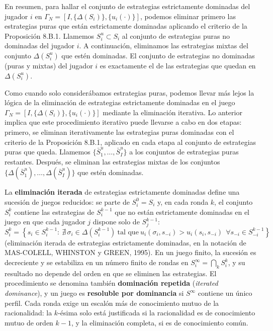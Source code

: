 \documentclass[10pt,a4paper]{article}
\begin{document}
\begin{cita}
En resumen, para hallar el conjunto de estrategias estrictamente dominadas del jugador $i$ en $\Gamma_N=[I,\{\Delta(S_i)\},\{u_i(\cdot)\}]$, podemos eliminar primero las estrategias puras que están estrictamente dominadas aplicando el criterio de la Proposición 8.B.1. Llamemos $S_i^u\subset S_i$ al conjunto de estrategias puras no dominadas del jugador $i$. A continuación, eliminamos las estrategias mixtas del conjunto $\Delta(S_i^u)$ que estén dominadas. El conjunto de estrategias no dominadas (puras y mixtas) del jugador $i$ es exactamente el de las estrategias que quedan en $\Delta(S_i^u)$.

Como cuando solo considerábamos estrategias puras, podemos llevar más lejos la lógica de la eliminación de estrategias estrictamente dominadas en el juego $\Gamma_N=[I,\{\Delta(S_i)\},\{u_i(\cdot)\}]$ mediante la eliminación iterativa. Lo anterior implica que este procedimiento iterativo puede llevarse a cabo en dos etapas: primero, se eliminan iterativamente las estrategias puras dominadas con el criterio de la Proposición 8.B.1, aplicado en cada etapa al conjunto de estrategias puras que queda. Llamemos $\{\bar{S}_1^u,\ldots,\bar{S}_I^u\}$ a los conjuntos de estrategias puras restantes. Después, se eliminan las estrategias mixtas de los conjuntos $\{\Delta(\bar{S}_1^u),\ldots,\Delta(\bar{S}_I^u)\}$ que estén dominadas.
\end{cita}

La \textbf{eliminación iterada} de estrategias estrictamente dominadas define una sucesión de juegos reducidos: se parte de $S_i^0=S_i$ y, en cada ronda $k$, el conjunto $S_i^{k}$ contiene las estrategias de $S_i^{k-1}$ que no están estrictamente dominadas en el juego en que cada jugador $j$ dispone solo de $S_j^{k-1}$:
$$S_i^k=\left\{s_i\in S_i^{k-1}:\ \nexists\,\sigma_i\in\Delta(S_i^{k-1})\ \text{tal que}\ u_i(\sigma_i,s_{-i})>u_i(s_i,s_{-i})\ \ \forall s_{-i}\in S_{-i}^{k-1}\right\}$$
(eliminación iterada de estrategias estrictamente dominadas, en la notación de MAS-COLELL, WHINSTON y GREEN, 1995). En un juego finito, la sucesión es decreciente y se estabiliza en un número finito de rondas en $S_i^\infty=\bigcap_kS_i^k$, y su resultado no depende del orden en que se eliminen las estrategias. El procedimiento se denomina también \textbf{dominación repetida} (\textit{iterated dominance}), y un juego es \textbf{resoluble por dominancia} si $S^\infty$ contiene un único perfil. Cada ronda exige un escalón más de conocimiento mutuo de la racionalidad: la $k$-ésima solo está justificada si la racionalidad es de conocimiento mutuo de orden $k-1$, y la eliminación completa, si es de conocimiento común.
\end{document}
